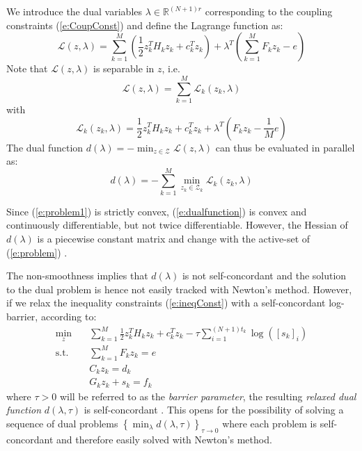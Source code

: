 We introduce the dual variables $\lambda \in \mathbb{R}^{(N+1) r}$ corresponding to the coupling constraints (\ref{e:CoupConst}) and define the Lagrange function as:
\begin{equation}
\mathcal{L}(z,\lambda) =  \sum_{k=1}^{M} ( \frac{1}{2}z_k^TH_kz_k + c_k^Tz_k ) + \lambda^T ( \sum_{k=1}^{M} F_k z_k - e )
\end{equation}
Note that $\mathcal{L}(z,\lambda)$ is separable in $z$, i.e.
\begin{equation}
\mathcal{L}(z,\lambda) = \sum_{k=1}^{M} \mathcal{L}_k (z_k,\lambda)
\end{equation}
with
\begin{equation}
\mathcal{L}_k(z_k,\lambda) = \frac{1}{2}z_k^TH_k z_k + c_k^T z_k + \lambda^T(F_k z_k - \frac{1}{M} e)
\end{equation}
The dual function $d(\lambda) = -\min_{z \in \mathcal{Z}} \mathcal{L}(z,\lambda)$ can thus be evaluated in parallel as:
\begin{equation}
\label{e:dualfunction}
d(\lambda) = -\sum_{k=1}^M \min_{z_k \in \mathcal{Z}_k} \mathcal{L}_k(z_k,\lambda)
\end{equation}

Since (\ref{e:problem1}) is strictly convex, (\ref{e:dualfunction}) is convex and continuously differentiable, but not twice differentiable. However, the Hessian of $d(\lambda)$ is a piecewise constant matrix and change with the active-set of (\ref{e:problem}) \cite{Kozma2014a}.

The non-smoothness implies that $d(\lambda)$ is not self-concordant and the solution to the dual problem is hence not easily tracked with Newton's method. However, if we relax the inequality constraints (\ref{e:ineqConst}) with a self-concordant log-barrier, according to:
\begin{subequations}
\label{e:relaxedproblem}
\begin{align}
\min_z & \quad \sum_{k=1}^{M} \frac{1}{2}z_k^TH_k z_k + c_k^T z_k - \tau \sum_{i=1}^{(N+1)t_k} \log([s_k]_i) \label{e:1} \\
\text{s.t.} & \quad \sum_{k=1}^{M} F_k z_k = e \\
& \quad C_k z_k = d_k \\
& \quad G_k z_k + s_k = f_k
\end{align}
\end{subequations}
where $\tau > 0$ will be referred to as the \emph{barrier parameter}, the resulting \emph{relaxed dual function} $d(\lambda, \tau)$ is self-concordant \cite{Necoara2009a}. This opens for the possibility of solving a sequence of dual problems $\left\{\min_\lambda d(\lambda, \tau) \right\}_{\tau \rightarrow 0}$ where each problem is self-concordant and therefore easily solved with Newton's method.

